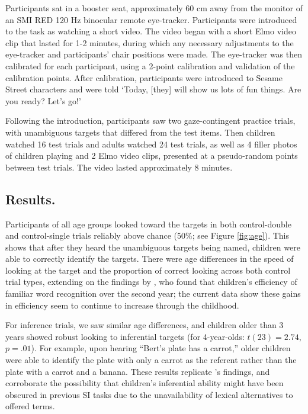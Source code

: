 \documentclass[10pt,letterpaper]{article}
\begin{document}
Participants sat in a booster seat, approximately 60 cm away from the monitor of an SMI RED 120 Hz binocular remote eye-tracker. Participants were introduced to the task as watching a short video. The video began with a short Elmo video clip that lasted for 1-2 minutes, during which any necessary adjustments to the eye-tracker and participants' chair positions were made. The eye-tracker was then calibrated for each participant, using a 2-point calibration and validation of the calibration points. After calibration, participants were introduced to Sesame Street characters and were told `Today, [they] will show us lots of fun things. Are you ready? Let's go!'

Following the introduction, participants saw two gaze-contingent practice trials, with unambiguous targets that differed from the test items. Then children watched 16 test trials and adults watched 24 test trials, as well as 4 filler photos of children playing and 2 Elmo video clips, presented at a pseudo-random points between test trials. The video lasted approximately 8 minutes.

\subsection{Results.}

Participants of all age groups looked toward the targets in both control-double and control-single trials reliably above chance (50\%; see Figure \ref{fig:age}). This shows that after they heard the unambiguous targets being named, children were able to correctly identify the targets. There were age differences in the speed of looking at the target and the proportion of correct looking across both control trial types, extending on the findings by , who found that children's efficiency of familiar word recognition over the second year; the current data show these gains in efficiency seem to continue to increase through the childhood. 

For inference trials, we saw similar age differences, and children older than 3 years showed robust looking to inferential targets (for 4-year-olds: $t(23) = 2.74$, $p =.01$). For example, upon hearing ``Bert's plate has a carrot,'' older children were able to identify the plate with only a carrot as the referent rather than the plate with a carrot and a banana. These results replicate 's findings, and corroborate the possibility that children's inferential ability might have been obscured in previous SI tasks due to the unavailability of lexical alternatives to offered terms.
\end{document}
